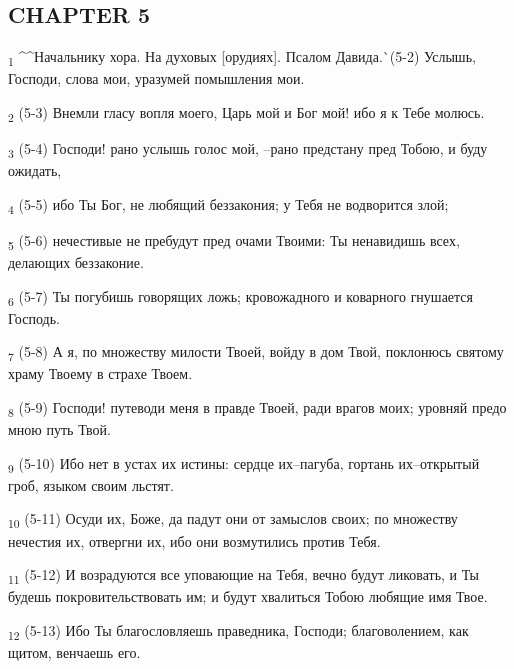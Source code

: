 \subsection{CHAPTER 5}
\begin{tcolorbox}
\textsubscript{1} ^^Начальнику хора. На духовых [орудиях]. Псалом Давида.^^ (5-2) Услышь, Господи, слова мои, уразумей помышления мои.
\end{tcolorbox}
\begin{tcolorbox}
\textsubscript{2} (5-3) Внемли гласу вопля моего, Царь мой и Бог мой! ибо я к Тебе молюсь.
\end{tcolorbox}
\begin{tcolorbox}
\textsubscript{3} (5-4) Господи! рано услышь голос мой, --рано предстану пред Тобою, и буду ожидать,
\end{tcolorbox}
\begin{tcolorbox}
\textsubscript{4} (5-5) ибо Ты Бог, не любящий беззакония; у Тебя не водворится злой;
\end{tcolorbox}
\begin{tcolorbox}
\textsubscript{5} (5-6) нечестивые не пребудут пред очами Твоими: Ты ненавидишь всех, делающих беззаконие.
\end{tcolorbox}
\begin{tcolorbox}
\textsubscript{6} (5-7) Ты погубишь говорящих ложь; кровожадного и коварного гнушается Господь.
\end{tcolorbox}
\begin{tcolorbox}
\textsubscript{7} (5-8) А я, по множеству милости Твоей, войду в дом Твой, поклонюсь святому храму Твоему в страхе Твоем.
\end{tcolorbox}
\begin{tcolorbox}
\textsubscript{8} (5-9) Господи! путеводи меня в правде Твоей, ради врагов моих; уровняй предо мною путь Твой.
\end{tcolorbox}
\begin{tcolorbox}
\textsubscript{9} (5-10) Ибо нет в устах их истины: сердце их--пагуба, гортань их--открытый гроб, языком своим льстят.
\end{tcolorbox}
\begin{tcolorbox}
\textsubscript{10} (5-11) Осуди их, Боже, да падут они от замыслов своих; по множеству нечестия их, отвергни их, ибо они возмутились против Тебя.
\end{tcolorbox}
\begin{tcolorbox}
\textsubscript{11} (5-12) И возрадуются все уповающие на Тебя, вечно будут ликовать, и Ты будешь покровительствовать им; и будут хвалиться Тобою любящие имя Твое.
\end{tcolorbox}
\begin{tcolorbox}
\textsubscript{12} (5-13) Ибо Ты благословляешь праведника, Господи; благоволением, как щитом, венчаешь его.
\end{tcolorbox}
